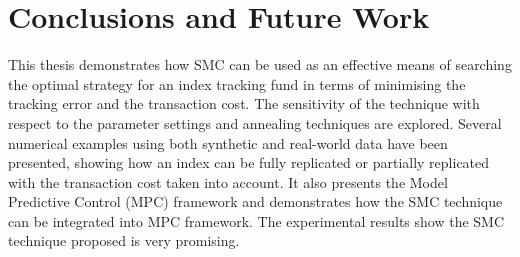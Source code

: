 \chapter{Conclusions and Future Work}
\graphicspath{{Chapter5/figures/}}
\label{cha:conclusions}
This thesis demonstrates how SMC can be used as an effective means of searching the optimal strategy for an index tracking fund in terms of minimising the tracking error and the transaction cost. The sensitivity of the technique with respect to the parameter settings and annealing techniques are explored. Several numerical examples using both synthetic and real-world data have been presented, showing how an index can be fully replicated or partially replicated with the transaction cost taken into account. It also presents the Model Predictive Control (MPC) framework and demonstrates how the SMC technique can be integrated into MPC framework. The experimental results show the SMC technique proposed is very promising.

